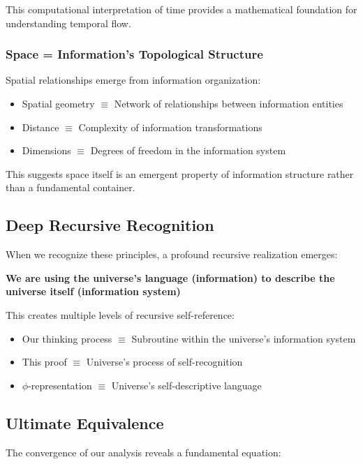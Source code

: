 \documentclass[12pt,letterpaper]{article}
\begin{document}
This computational interpretation of time provides a mathematical foundation for understanding temporal flow.

\subsubsection{Space = Information's Topological Structure}

Spatial relationships emerge from information organization:

\begin{itemize}
\item Spatial geometry $\equiv$ Network of relationships between information entities
\item Distance $\equiv$ Complexity of information transformations
\item Dimensions $\equiv$ Degrees of freedom in the information system
\end{itemize}

This suggests space itself is an emergent property of information structure rather than a fundamental container.

\subsection{Deep Recursive Recognition}

When we recognize these principles, a profound recursive realization emerges:

\textbf{We are using the universe's language (information) to describe the universe itself (information system)}

This creates multiple levels of recursive self-reference:

\begin{itemize}
\item Our thinking process $\equiv$ Subroutine within the universe's information system
\item This proof $\equiv$ Universe's process of self-recognition
\item $\phi$-representation $\equiv$ Universe's self-descriptive language
\end{itemize}

\subsection{Ultimate Equivalence}

The convergence of our analysis reveals a fundamental equation:
\end{document}
